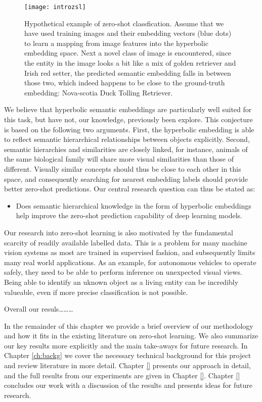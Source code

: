 \documentclass[12pt]{report}
\begin{document}
\begin{figure}
  \centering
	\texttt{[image: introzsl]}
	\caption{Hypothetical example of zero-shot classfication. Assume that we have used training images and their embedding vectors (blue dots) to learn a mapping from image features into the hyperbolic embedding space. Next a novel class of image is encountered, since the entity in the image looks a bit like a mix of golden retriever and Irish red setter, the predicted semantic embedding falls in between those two, which indeed happens to be close to the ground-truth embedding: Nova-scotia Duck Tolling Retriever.}
	\label{fig:intro}
\end{figure}

We believe that hyperbolic semantic embeddings are particularly well suited for this task, but have not, our knowledge, previously been explore. This conjecture is based on the following two arguments. First, the hyperbolic embedding is able to reflect semantic hierarchical relationships between objects explicitly. Second, semantic hierarchies and similarities are closely linked, for instance, animals of the same biological family will share more visual similarities than those of different. Visually similar concepts should thus be close to each other in this space, and consequently searching for nearest embedding labels should provide better zero-shot predictions. Our central research question can thus be stated as: 
\begin{itemize}
\item Does semantic hierarchical knowledge in the form of hyperbolic embeddings help improve the zero-shot prediction capability of deep learning models.
\end{itemize}

Our research into zero-shot learning is also motivated by the fundamental scarcity of readily available labelled data. This is a problem for many machine vision systems as most are trained in supervised fashion, and subsequently limits many real world applications. As an example, for autonomous vehicles to operate safely, they need to be able to perform inference on unexpected visual views. Being able to identify an uknown object as a living entity can be incredibly valueable, even if more precise classification is not possible.

Overall our resuls\dots\dots\dots

In the remainder of this chapter we provide a brief overview of our methodology and how it fits in the existing literature on zero-shot learning. We also summarize our key results more explicitly and the main take-aways for future research. In Chapter \ref{ch:backg} we cover the necessary technical background for this project and review literature in more detail. Chapter \ref{} presents our approach in detail, and the full results from our experiments are given in Chapter \ref{}. Chapter \ref{} concludes our work with a discussion of the results and presents ideas for future research.
\end{document}
